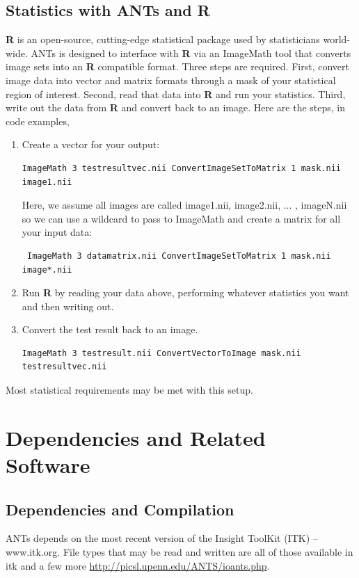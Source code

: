 \documentclass{InsightArticle}
\begin{document}
\subsection{Statistics with ANTs and {\bf R}}
{\bf R} is an open-source, cutting-edge statistical package 
used by statisticians world-wide.   ANTs is designed to 
interface with {\bf R} via an ImageMath tool that converts 
image sets into an {\bf R} compatible format.  
Three steps are required.  First, convert image data into 
vector and matrix formats through a mask of your statistical 
region of interest.  Second, read that data into {\bf R} and 
run your statistics.  Third, write out the data from {\bf R} and 
convert back to an image.  Here are the steps, in code examples,
\begin{enumerate}
\item Create a vector for your output: 
\begin{verbatim} 
ImageMath 3 testresultvec.nii ConvertImageSetToMatrix 1 mask.nii image1.nii
\end{verbatim}
Here, we assume all images are called image1.nii, image2.nii, ... , imageN.nii so we 
can use a wildcard to pass to ImageMath and 
create a matrix for all your input data: 
\begin{verbatim} 
 ImageMath 3 datamatrix.nii ConvertImageSetToMatrix 1 mask.nii image*.nii 
\end{verbatim}
\item   Run {\bf R} by reading your data above, performing whatever statistics you want and then 
writing out.  
\item   Convert the test result back to an image.  
\begin{verbatim} 
ImageMath 3 testresult.nii ConvertVectorToImage mask.nii testresultvec.nii
\end{verbatim}
\end{enumerate}
Most statistical requirements may be met with this setup. 
\newpage
\section{Dependencies and Related Software}
\subsection{Dependencies and Compilation}
ANTs depends on the most recent version of the Insight ToolKit (ITK)
-- www.itk.org.   File types that may be read and written are 
all of those available in itk and a few more \href{http://picsl.upenn.edu/ANTS/ioants.php}{http://picsl.upenn.edu/ANTS/ioants.php}.
\end{document}
